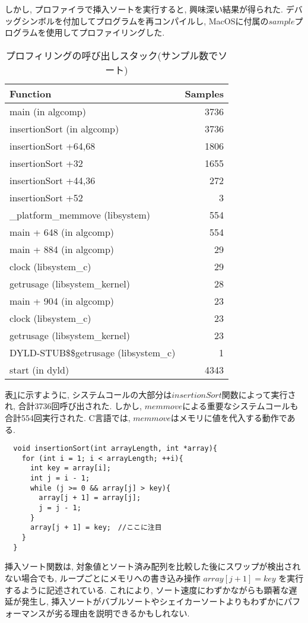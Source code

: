 \documentclass[a4j, 11pt]{jarticle}
\begin{document}
しかし, プロファイラで挿入ソートを実行すると, 興味深い結果が得られた. デバッグシンボルを付加してプログラムを再コンパイルし, MacOSに付属の$sample$プログラムを使用してプロファイリングした. 
\begin{table}[H]
  \centering
  \caption{プロフィリングの呼び出しスタック(サンプル数でソート)}\label{tab:call_stack_samples}
  \begin{tabular}{|l|r|}
    \hline
    \textbf{Function} & \textbf{Samples} \\
    \hline
    main (in algcomp)                 & 3736 \\
    insertionSort (in algcomp)       & 3736 \\
    \quad insertionSort +64,68       & 1806 \\
    \quad insertionSort +32          & 1655 \\
    \quad insertionSort +44,36       & 272  \\
    \quad insertionSort +52          & 3    \\
    \_platform\_memmove (libsystem)  & 554  \\
    main + 648 (in algcomp)          & 554  \\
    main + 884 (in algcomp)          & 29   \\
    clock (libsystem\_c)             & 29   \\
    getrusage (libsystem\_kernel)    & 28   \\
    main + 904 (in algcomp)          & 23   \\
    clock (libsystem\_c)             & 23   \\
    getrusage (libsystem\_kernel)    & 23   \\
    DYLD-STUB\$\$getrusage (libsystem\_c) & 1 \\
    start (in dyld)                  & 4343 \\
    \hline
  \end{tabular}
\end{table}
表\ref{tab:call_stack_samples}に示すように, システムコールの大部分は$insertionSort$関数によって実行され, 合計3736回呼び出された. しかし, $memmove$による重要なシステムコールも合計554回実行された. C言語では, $memmove$はメモリに値を代入する動作である. 
\begin{verbatim}
  void insertionSort(int arrayLength, int *array){
    for (int i = 1; i < arrayLength; ++i){
      int key = array[i];
      int j = i - 1;
      while (j >= 0 && array[j] > key){
        array[j + 1] = array[j];
        j = j - 1;
      }
      array[j + 1] = key;　//ここに注目
    }
  }
\end{verbatim}
挿入ソート関数は, 対象値とソート済み配列を比較した後にスワップが検出されない場合でも, ループごとにメモリへの書き込み操作 $array[j + 1] = key$ を実行するように記述されている. これにより, ソート速度にわずかながらも顕著な遅延が発生し, 挿入ソートがバブルソートやシェイカーソートよりもわずかにパフォーマンスが劣る理由を説明できるかもしれない. \
\end{document}
